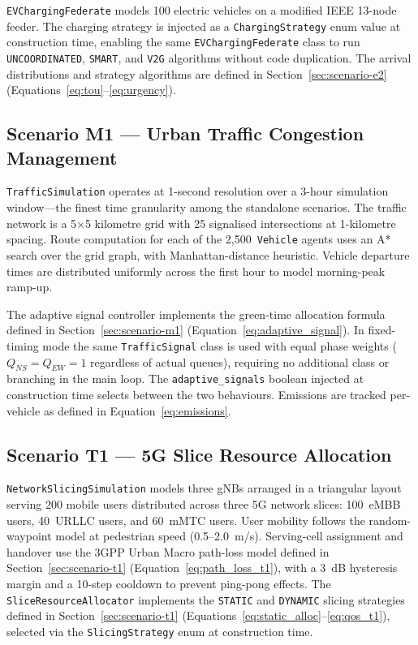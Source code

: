 \texttt{EVChargingFederate} models 100 electric vehicles on a modified IEEE 13-node feeder. The charging strategy is injected as a \texttt{ChargingStrategy} enum value at construction time, enabling the same \texttt{EVChargingFederate} class to run \texttt{UNCOORDINATED}, \texttt{SMART}, and \texttt{V2G} algorithms without code duplication. The arrival distributions and strategy algorithms are defined in Section~\ref{sec:scenario-e2} (Equations~\ref{eq:tou}--\ref{eq:urgency}).

\subsection{Scenario M1 --- Urban Traffic Congestion Management}

\texttt{TrafficSimulation} operates at 1-second resolution over a 3-hour simulation window---the finest time granularity among the standalone scenarios. The traffic network is a 5$\times$5 kilometre grid with 25 signalised intersections at 1-kilometre spacing. Route computation for each of the 2{,}500~\texttt{Vehicle} agents uses an A* search over the grid graph, with Manhattan-distance heuristic. Vehicle departure times are distributed uniformly across the first hour to model morning-peak ramp-up.

The adaptive signal controller implements the green-time allocation formula defined in Section~\ref{sec:scenario-m1} (Equation~\ref{eq:adaptive_signal}). In fixed-timing mode the same \texttt{TrafficSignal} class is used with equal phase weights ($Q_{NS} = Q_{EW} = 1$ regardless of actual queues), requiring no additional class or branching in the main loop. The \texttt{adaptive\_signals} boolean injected at construction time selects between the two behaviours. Emissions are tracked per-vehicle as defined in Equation~\ref{eq:emissions}.

\subsection{Scenario T1 --- 5G Slice Resource Allocation}

\texttt{NetworkSlicingSimulation} models three gNBs arranged in a triangular layout serving 200 mobile users distributed across three 5G network slices: 100~eMBB users, 40~URLLC users, and 60~mMTC users. User mobility follows the random-waypoint model at pedestrian speed (0.5--2.0~m/s). Serving-cell assignment and handover use the 3GPP Urban Macro path-loss model defined in Section~\ref{sec:scenario-t1} (Equation~\ref{eq:path_loss_t1}), with a 3~dB hysteresis margin and a 10-step cooldown to prevent ping-pong effects. The \texttt{SliceResourceAllocator} implements the \texttt{STATIC} and \texttt{DYNAMIC} slicing strategies defined in Section~\ref{sec:scenario-t1} (Equations~\ref{eq:static_alloc}--\ref{eq:qos_t1}), selected via the \texttt{SlicingStrategy} enum at construction time.

